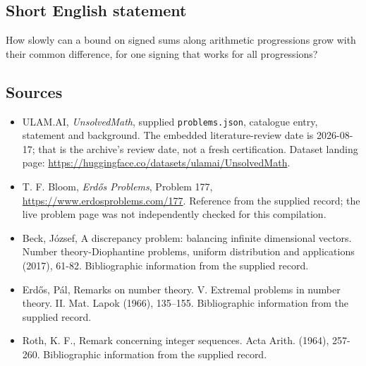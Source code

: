 \documentclass[11pt,a4paper]{article}
\begin{document}
\subsection{Short English statement}

How slowly can a bound on signed sums along arithmetic progressions grow with their common difference, for one signing that works for all progressions?

\subsection{Sources}

{\small

\begin{itemize}

\item[\hypertarget{source:statement:1}{S1}] ULAM.AI, \emph{UnsolvedMath}, supplied \texttt{problems.json}, catalogue entry, statement and background. The embedded literature-review date is 2026-08-17; that is the archive’s review date, not a fresh certification. Dataset landing page: \url{https://huggingface.co/datasets/ulamai/UnsolvedMath}.

\item[\hypertarget{source:statement:2}{S2}] T. F. Bloom, \emph{Erdős Problems}, Problem 177, \url{https://www.erdosproblems.com/177}. Reference from the supplied record; the live problem page was not independently checked for this compilation.

\item[\hypertarget{source:statement:3}{S3}] Beck, J\'{o}zsef, A discrepancy problem: balancing infinite dimensional vectors. Number theory-Diophantine problems, uniform distribution and applications (2017), 61-82. Bibliographic information from the supplied record.

\item[\hypertarget{source:statement:4}{S4}] Erd\H{o}s, P\'al, Remarks on number theory. {V}. {E}xtremal problems in number theory. {II}. Mat. Lapok (1966), 135--155. Bibliographic information from the supplied record.

\item[\hypertarget{source:statement:5}{S5}] Roth, K. F., Remark concerning integer sequences. Acta Arith. (1964), 257-260. Bibliographic information from the supplied record.

\end{itemize}

}

\label{end:statement}
\end{document}
